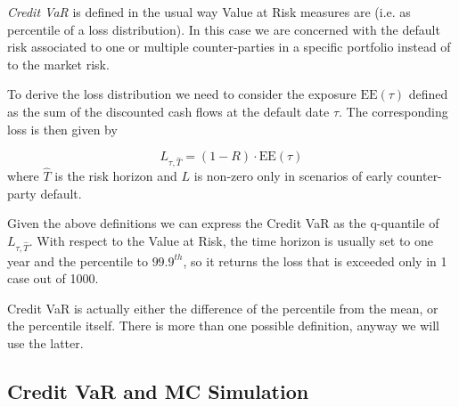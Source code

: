 \emph{Credit VaR} is defined in the usual way Value at Risk measures are (i.e. as percentile of a loss distribution).
In this case we are concerned with the default risk associated to one or multiple counter-parties in a specific portfolio instead of to the market risk.

To derive the loss distribution we need to consider the exposure $\textrm{EE}(\tau)$ defined as the sum of the discounted cash flows at the default date $\tau$. The corresponding loss is then given by

\begin{equation}
L_{\tau, \hat{T}} = (1 - R) \cdot \textrm{EE}(\tau)
\end{equation}
where \(\hat{T}\) is the risk horizon and $L$ is non-zero only in scenarios of early counter-party default. 

Given the above definitions we can express the Credit VaR as the q-quantile of $L_{\tau, \hat{T}}$.
With respect to the Value at Risk, the time horizon is usually set to one year and the percentile to $99.9^{th}$, so it returns the loss that is exceeded only in 1 case out of 1000. 

Credit VaR is actually either the difference of the percentile from the mean, or the percentile itself. There is more than one possible definition, anyway we  will use the latter.

%

\subsection{Credit VaR and MC Simulation}

